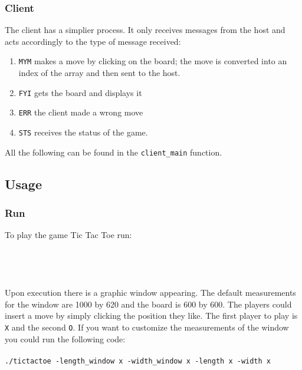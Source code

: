\documentclass{article}
\begin{document}
\subsubsection{Client }
The client has a simplier process. It only receives messages from the host and acts accordingly to the type of message received:
\begin{enumerate}
\item \texttt{MYM} makes a move by clicking on the board; the move is converted into an index of the array and then sent to the host.
\item \texttt{FYI} gets the board and displays it
\item \texttt{ERR} the client made a wrong move
\item \texttt{STS} receives the status of the game. 
\end{enumerate}
All the following can be found in the \texttt{client\_main} function.
\subsection{Usage}
\subsubsection{Run}
To play the game Tic Tac Toe run:\\\\
\\
\\\\
Upon execution there is a graphic window appearing. The default measurements for the window are 1000 by 620 and the board is 600 by 600. The players could insert a move by simply clicking the position they like. The first player to play is \texttt{X} and the second \texttt{O}. If you want to customize the measurements of the window you could run the following code:\\\\
\texttt{./tictactoe -length\_window x -width\_window x -length x -width x}
  
\end{document}

